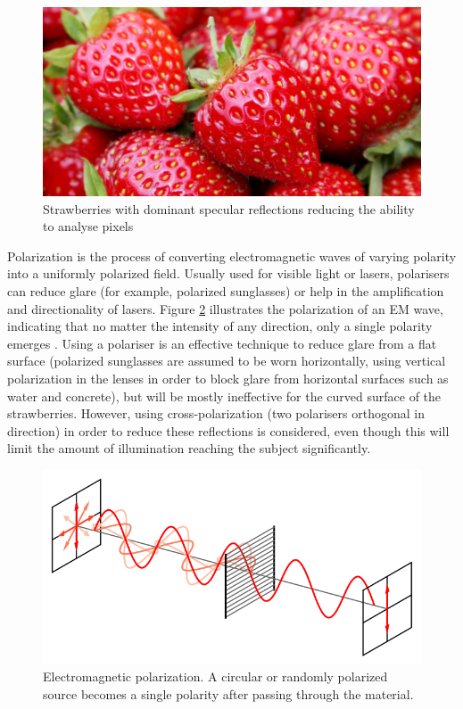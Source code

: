 \documentclass[fleqn,twoside,12pt]{report}
\begin{document}
\begin{figure}[h]
	\centering
	\includegraphics[width=.6\linewidth]{strawberry_glare.jpg}
	\caption{Strawberries with dominant specular reflections reducing the ability to analyse pixels}
	\label{fig:strawberry_glare}
\end{figure}%


Polarization is the process of converting electromagnetic waves of varying polarity into a uniformly polarized field. Usually used for visible light or lasers, polarisers can reduce glare (for example, polarized sunglasses) or help in the amplification and directionality of lasers. Figure \ref{fig:polarization} illustrates the polarization of an EM wave, indicating that no matter the intensity of any direction, only a single polarity emerges  \cite{physicsopenlab}. Using a polariser is an effective technique to reduce glare from a flat surface (polarized sunglasses are assumed to be worn horizontally, using vertical polarization in the lenses in order to block glare from horizontal surfaces such as water and concrete), but will be mostly ineffective for the curved surface of the strawberries. However, using cross-polarization (two polarisers orthogonal in direction) in order to reduce these reflections is considered, even though this will limit the amount of illumination reaching the subject significantly.

\begin{figure}[h]
	\centering
	\includegraphics[width=.8\linewidth]{polarization.png}
	\caption{Electromagnetic polarization. A circular or randomly polarized source becomes a single polarity after passing through the material.}
	\label{fig:polarization}
\end{figure}%
\end{document}
